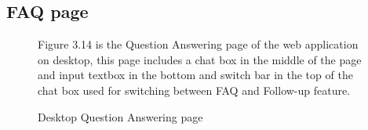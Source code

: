 \documentclass[12pt,oneside,openright,a4paper]{cpe-english-project}
\begin{document}
    \subsection{FAQ page}
    \begin{figure}[!h]
      \centering
      \caption{Desktop Question Answering page}\label{fig:Desk_Follow}
      \begin{flushleft}
        \qquad Figure 3.14 is the Question Answering page of the web application on desktop, this page includes a chat box in the middle of the page and input textbox in the bottom and switch bar in the top of the chat box used for switching between FAQ and Follow-up feature. \par
      \end{flushleft}
    \end{figure}
\newpage
\end{document}
